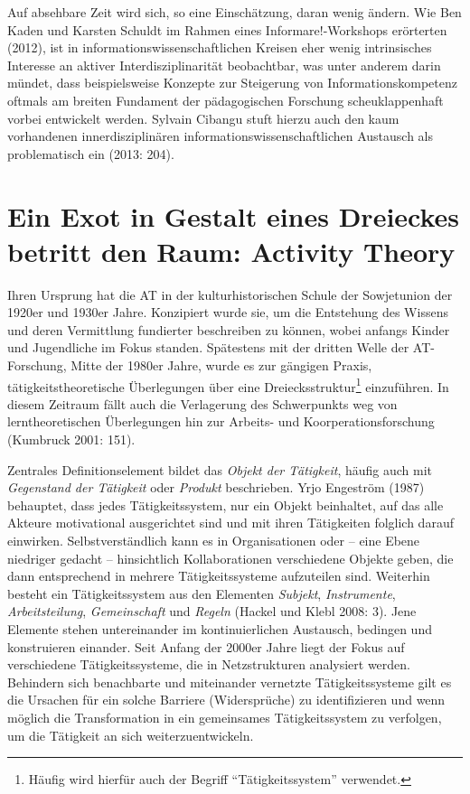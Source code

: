 \documentclass[a4paper,
fontsize=11pt,
oneside,
numbers=noperiodatend,
parskip=half-,
bibliography=totoc,
final
]{scrartcl}
\begin{document}
Auf absehbare Zeit wird sich, so eine Einschätzung, daran wenig ändern.
Wie Ben Kaden und Karsten Schuldt im Rahmen eines Informare!-Workshops
erörterten (2012), ist in informationswissenschaftlichen Kreisen eher
wenig intrinsisches Interesse an aktiver Interdisziplinarität
beobachtbar, was unter anderem darin mündet, dass beispielsweise
Konzepte zur Steigerung von Informationskompetenz oftmals am breiten
Fundament der pädagogischen Forschung scheuklappenhaft vorbei entwickelt
werden. Sylvain Cibangu stuft hierzu auch den kaum vorhandenen
innerdisziplinären informationswissenschaftlichen Austausch als
problematisch ein (2013: 204).

\section*{Ein Exot in Gestalt eines Dreieckes betritt den Raum:
Activity
Theory}\label{ein-exot-in-gestalt-eines-dreieckes-betritt-den-raum-activity-theory}

Ihren Ursprung hat die AT in der kulturhistorischen Schule der
Sowjetunion der 1920er und 1930er Jahre. Konzipiert wurde sie, um die
Entstehung des Wissens und deren Vermittlung fundierter beschreiben zu
können, wobei anfangs Kinder und Jugendliche im Fokus standen.
Spätestens mit der dritten Welle der AT-Forschung, Mitte der 1980er
Jahre, wurde es zur gängigen Praxis, tätigkeitstheoretische Überlegungen
über eine Dreiecksstruktur\footnote{Häufig wird hierfür auch der Begriff
  \enquote{Tätigkeitssystem} verwendet.} einzuführen. In diesem Zeitraum
fällt auch die Verlagerung des Schwerpunkts weg von lerntheoretischen
Überlegungen hin zur Arbeits- und Koorperationsforschung (Kumbruck 2001:
151).

Zentrales Definitionselement bildet das \emph{Objekt der Tätigkeit},
häufig auch mit \emph{Gegenstand der Tätigkeit} oder \emph{Produkt}
beschrieben. Yrjo Engeström (1987) behauptet, dass jedes
Tätigkeitssystem, nur ein Objekt beinhaltet, auf das alle Akteure
motivational ausgerichtet sind und mit ihren Tätigkeiten folglich darauf
einwirken. Selbstverständlich kann es in Organisationen oder -- eine
Ebene niedriger gedacht -- hinsichtlich Kollaborationen verschiedene
Objekte geben, die dann entsprechend in mehrere Tätigkeitssysteme
aufzuteilen sind. Weiterhin besteht ein Tätigkeitssystem aus den
Elementen \emph{Subjekt}, \emph{Instrumente}, \emph{Arbeitsteilung},
\emph{Gemeinschaft} und \emph{Regeln} (Hackel und Klebl 2008: 3). Jene
Elemente stehen untereinander im kontinuierlichen Austausch, bedingen
und konstruieren einander. Seit Anfang der 2000er Jahre liegt der Fokus
auf verschiedene Tätigkeitssysteme, die in Netzstrukturen analysiert
werden. Behindern sich benachbarte und miteinander vernetzte
Tätigkeitssysteme gilt es die Ursachen für ein solche Barriere
(Widersprüche) zu identifizieren und wenn möglich die Transformation in
ein gemeinsames Tätigkeitssystem zu verfolgen, um die Tätigkeit an sich
weiterzuentwickeln.
\end{document}

